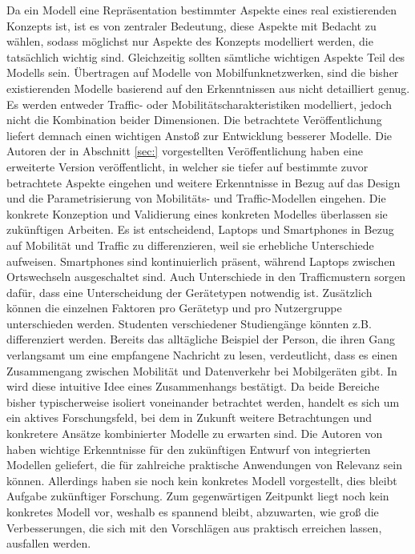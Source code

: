 \documentclass[12pt, a4paper]{article}
\begin{document}
Da ein Modell eine Repräsentation bestimmter Aspekte eines real existierenden Konzepts ist,
ist es von zentraler Bedeutung, diese Aspekte mit Bedacht zu wählen, sodass möglichst nur
Aspekte des Konzepts modelliert werden, die tatsächlich wichtig sind. Gleichzeitig sollten
sämtliche wichtigen Aspekte Teil des Modells sein.
Übertragen auf Modelle von Mobilfunknetzwerken, sind die bisher existierenden Modelle
basierend auf den Erkenntnissen aus \cite{Alipour2018} nicht detailliert genug. Es werden entweder
Traffic- oder Mobilitätscharakteristiken modelliert, jedoch nicht die Kombination beider Dimensionen.
Die betrachtete Veröffentlichung liefert demnach einen wichtigen Anstoß zur Entwicklung besserer Modelle.
\newline\newline
Die Autoren der in Abschnitt \ref{sec:} vorgestellten Veröffentlichung haben eine erweiterte Version veröffentlicht,
in welcher sie tiefer auf bestimmte zuvor betrachtete Aspekte eingehen und weitere Erkenntnisse in Bezug
auf das Design und die Parametrisierung von Mobilitäts- und Traffic-Modellen eingehen.
Die konkrete Konzeption und Validierung eines konkreten Modelles überlassen sie zukünftigen Arbeiten.
Es ist entscheidend, Laptops und Smartphones in Bezug auf Mobilität und Traffic zu differenzieren,
weil sie erhebliche Unterschiede aufweisen. Smartphones sind kontinuierlich präsent, während Laptops
zwischen Ortswechseln ausgeschaltet sind. Auch Unterschiede in den Trafficmustern sorgen dafür, dass
eine Unterscheidung der Gerätetypen notwendig ist. Zusätzlich können die einzelnen Faktoren
pro Gerätetyp und pro Nutzergruppe unterschieden werden. Studenten verschiedener Studiengänge könnten z.B.
differenziert werden.
\newline\newline
Bereits das alltägliche Beispiel der Person, die ihren Gang verlangsamt um eine empfangene Nachricht zu lesen,
verdeutlicht, dass es einen Zusammengang zwischen Mobilität und Datenverkehr bei Mobilgeräten gibt.
In \cite{Alipour2018} wird diese intuitive Idee eines Zusammenhangs bestätigt. Da beide Bereiche
bisher typischerweise isoliert voneinander betrachtet werden, handelt es sich um ein aktives Forschungsfeld,
bei dem in Zukunft weitere Betrachtungen und konkretere Ansätze kombinierter Modelle zu erwarten sind.
\newline\newline
Die Autoren von \cite{Alipour2018} haben wichtige Erkenntnisse für den zukünftigen Entwurf von integrierten Modellen
geliefert, die für zahlreiche praktische Anwendungen von Relevanz sein können. Allerdings haben sie noch kein konkretes
Modell vorgestellt, dies bleibt Aufgabe zukünftiger Forschung. Zum gegenwärtigen Zeitpunkt liegt noch kein konkretes Modell
vor, weshalb es spannend bleibt, abzuwarten, wie groß die Verbesserungen, die sich mit den Vorschlägen aus \cite{Alipour2018}
praktisch erreichen lassen, ausfallen werden.

\vfill
\pagebreak


%

\end{document}
